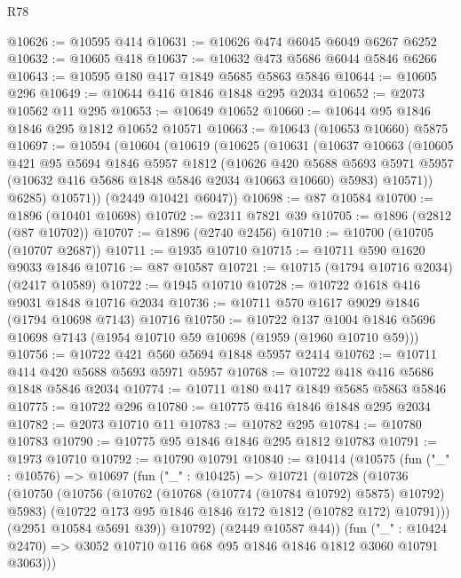 \begin{lexlean}{R78}
\begin{coremodule}
@10626 := @10595 @414
@10631 := @10626 @474 @6045 @6049 @6267 @6252
@10632 := @10605 @418
@10637 := @10632 @473 @5686 @6044 @5846 @6266
@10643 := @10595 @180 @417 @1849 @5685 @5863 @5846
@10644 := @10605 @296
@10649 := @10644 @416 @1846 @1848 @295 @2034
@10652 := @2073 @10562 @11 @295
@10653 := @10649 @10652
@10660 := @10644 @95 @1846 @1846 @295 @1812 @10652 @10571
@10663 := @10643 (@10653 @10660) @5875
@10697 := @10594
    (@10604
      (@10619
        (@10625
          (@10631
            (@10637
              @10663
              (@10605
                @421
                @95
                @5694
                @1846
                @5957
                @1812
                (@10626
                  @420
                  @5688
                  @5693
                  @5971
                  @5957
                  (@10632 @416 @5686 @1848 @5846 @2034 @10663 @10660)
                  @5983)
                @10571))
            @6285)
          @10571))
      (@2449 @10421 @6047))
@10698 := @87 @10584
@10700 := @1896 (@10401 @10698)
@10702 := @2311 @7821 @39
@10705 := @1896 (@2812 (@87 @10702))
@10707 := @1896 (@2740 @2456)
@10710 := @10700 (@10705 (@10707 @2687))
@10711 := @1935 @10710
@10715 := @10711 @590 @1620 @9033 @1846
@10716 := @87 @10587
@10721 := @10715 (@1794 @10716 @2034) (@2417 @10589)
@10722 := @1945 @10710
@10728 := @10722 @1618 @416 @9031 @1848 @10716 @2034
@10736 := @10711 @570 @1617 @9029 @1846 (@1794 @10698 @7143) @10716
@10750 := @10722
    @137
    @1004
    @1846
    @5696
    @10698
    @7143
    (@1954 @10710 @59 @10698 (@1959 (@1960 @10710 @59)))
@10756 := @10722 @421 @560 @5694 @1848 @5957 @2414
@10762 := @10711 @414 @420 @5688 @5693 @5971 @5957
@10768 := @10722 @418 @416 @5686 @1848 @5846 @2034
@10774 := @10711 @180 @417 @1849 @5685 @5863 @5846
@10775 := @10722 @296
@10780 := @10775 @416 @1846 @1848 @295 @2034
@10782 := @2073 @10710 @11
@10783 := @10782 @295
@10784 := @10780 @10783
@10790 := @10775 @95 @1846 @1846 @295 @1812 @10783
@10791 := @1973 @10710
@10792 := @10790 @10791
@10840 := @10414
    (@10575
      (fun ("_" : @10576) =>
      @10697
        (fun ("_" : @10425) =>
        @10721
          (@10728
            (@10736
              (@10750
                (@10756
                  (@10762 (@10768 (@10774 (@10784 @10792) @5875) @10792) @5983)
                  (@10722 @173 @95 @1846 @1846 @172 @1812 (@10782 @172) @10791)))
              (@2951 @10584 @5691 @39))
            @10792)
          (@2449 @10587 @44))
        (fun ("_" : @10424 @2470) =>
        @3052 @10710 @116 @68 @95 @1846 @1846 @1812 @3060 @10791 @3063)))

\end{coremodule}
\end{lexlean}
